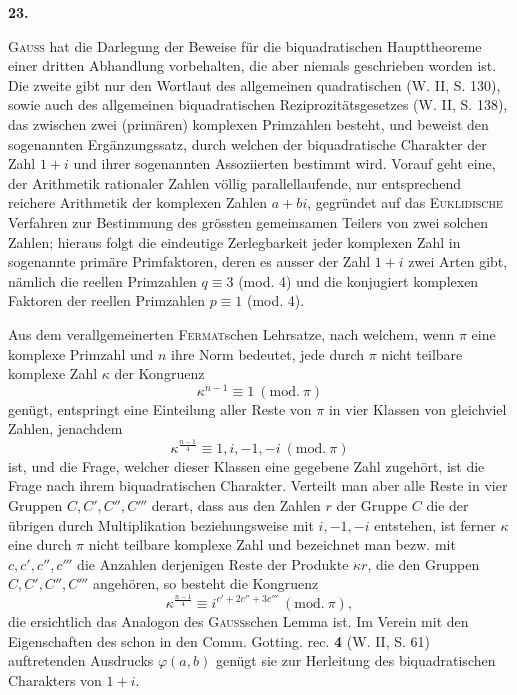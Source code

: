 \newpage{}
\begin{center}\bfseries 23.\end{center}
\noindent\hspace*{\parindent}\textsc{Gauss} hat die Darlegung der Beweise für die biquadratischen Haupttheoreme einer dritten Abhandlung vorbehalten, die aber niemals geschrieben worden ist. Die zweite gibt nur den Wortlaut des allgemeinen quadratischen (W. II, S. 130), sowie auch des allgemeinen biquadratischen Reziprozitätsgesetzes (W. II, S. 138), das zwischen zwei (primären) komplexen Primzahlen besteht, und beweist den sogenannten Ergänzungssatz, durch welchen der biquadratische Charakter der Zahl \(1+i\) und ihrer sogenannten Assoziierten bestimmt wird. Vorauf geht eine, der Arithmetik rationaler Zahlen völlig parallellaufende, nur entsprechend reichere Arithmetik der komplexen Zahlen \(a+bi\), gegründet auf das \textsc{Euklidische} Verfahren zur Bestimmung des grössten gemeinsamen Teilers von zwei solchen Zahlen; hieraus folgt die eindeutige Zerlegbarkeit jeder komplexen Zahl in sogenannte primäre Primfaktoren, deren es ausser der Zahl \(1+i\) zwei Arten gibt, nämlich die reellen Primzahlen \(q\equiv3\) (mod. 4) und die konjugiert komplexen Faktoren der reellen Primzahlen \(p\equiv1\) (mod. 4).

Aus dem verallgemeinerten \textsc{Fermat}schen Lehrsatze, nach welchem, wenn \(\pi\) eine komplexe Primzahl und \(n\) ihre Norm bedeutet, jede durch \(\pi\) nicht teilbare komplexe Zahl \(\kappa\) der Kongruenz
\[
\kappa^{n-1}\equiv1\ (\mathrm{mod.}\ \pi)
\]
genügt, entspringt eine Einteilung aller Reste von \(\pi\) in vier Klassen von gleichviel Zahlen, jenachdem
\[
\kappa^{\frac{n-1}{4}}\equiv1,i,-1,-i\ (\mathrm{mod.}\ \pi)
\]
ist, und die Frage, welcher dieser Klassen eine gegebene Zahl zugehört, ist die Frage nach ihrem biquadratischen Charakter. Verteilt man aber alle Reste in vier Gruppen \(C,C',C'',C'''\) derart, dass aus den Zahlen \(r\) der Gruppe \(C\) die der übrigen durch Multiplikation beziehungsweise mit \(i,-1,-i\) entstehen, ist ferner \(\kappa\) eine durch \(\pi\) nicht teilbare komplexe Zahl und bezeichnet man bezw. mit \(c,c',c'',c'''\) die Anzahlen derjenigen Reste der Produkte \(\kappa r\), die den Gruppen \(C,C',C'',C'''\) angehören, so besteht die Kongruenz
\newpage{}
\[
\kappa^{\frac{n-1}{4}}\equiv i^{c'+2c''+3c'''}\ (\mathrm{mod.}\ \pi),
\]
die ersichtlich das Analogon des \textsc{Gauss}schen Lemma ist. Im Verein mit den Eigenschaften des schon in den Comm. Gotting. rec. \textbf{4} (W. II, S. 61) auftretenden Ausdrucks \(\varphi(a,b)\) genügt sie zur Herleitung des biquadratischen Charakters von \(1+i\).

